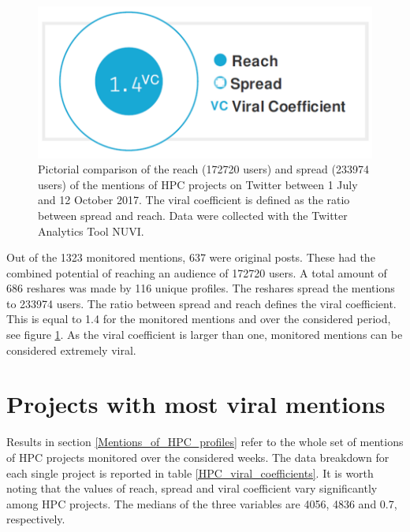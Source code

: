 \begin{figure}[!t] 
 \begin{center}
 \includegraphics[scale=0.2]{Images/HPC_viral_coefficient.png}
 \caption{Pictorial comparison of the reach (172720 users) and spread (233974 users) of the mentions of HPC projects on Twitter between 1 July and 12 October 2017. The viral coefficient is defined as the ratio between spread and reach. Data were collected with the Twitter Analytics Tool NUVI.}
 \label{HPC_viral_coefficient}
 \end{center}
\end{figure}

Out of the 1323 monitored mentions, 637 were original posts. These had the combined potential of reaching an audience of 172720 users. A total amount of 686 reshares was made by 116 unique profiles. The reshares spread the mentions to 233974 users. The ratio between spread and reach defines the viral coefficient. This is equal to 1.4 for the monitored mentions and over the considered period, see figure \ref{HPC_viral_coefficient}. As the viral coefficient is larger than one, monitored mentions can be considered extremely viral. 

\section{Projects with most viral mentions} \label{Projects_with_most_viral_mentions}
Results in section \ref{Mentions_of_HPC_profiles} refer to the whole set of mentions of HPC projects monitored over the considered weeks. The data breakdown for each single project is reported in table \ref{HPC_viral_coefficients}. It is worth noting that the values of reach, spread and viral coefficient vary significantly among HPC projects. The medians of the three variables are 4056, 4836 and 0.7, respectively.     
 
